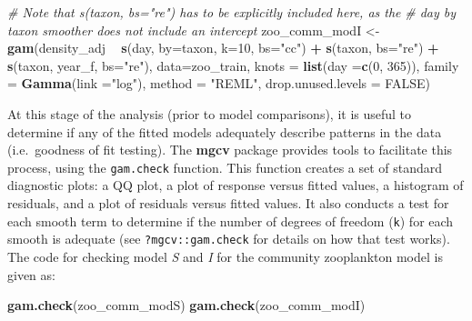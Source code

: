 \documentclass[12pt]{article}
\newenvironment{Shaded}{\begin{snugshade}}{\end{snugshade}}
\newcommand{\KeywordTok}[1]{\textcolor[rgb]{0.13,0.29,0.53}{\textbf{#1}}}
\newcommand{\DataTypeTok}[1]{\textcolor[rgb]{0.13,0.29,0.53}{#1}}
\newcommand{\DecValTok}[1]{\textcolor[rgb]{0.00,0.00,0.81}{#1}}
\newcommand{\StringTok}[1]{\textcolor[rgb]{0.31,0.60,0.02}{#1}}
\newcommand{\CommentTok}[1]{\textcolor[rgb]{0.56,0.35,0.01}{\textit{#1}}}
\newcommand{\OtherTok}[1]{\textcolor[rgb]{0.56,0.35,0.01}{#1}}
\newcommand{\OperatorTok}[1]{\textcolor[rgb]{0.81,0.36,0.00}{\textbf{#1}}}
\newcommand{\NormalTok}[1]{#1}
\begin{document}
\begin{Shaded}
\begin{Highlighting}[]
\CommentTok{# Note that  s(taxon, bs="re") has to be explicitly included here, as the }
\CommentTok{# day  by taxon smoother does not include an intercept}
\NormalTok{zoo_comm_modI <-}\StringTok{ }\KeywordTok{gam}\NormalTok{(density_adj }\OperatorTok{~}\StringTok{ }\KeywordTok{s}\NormalTok{(day, }\DataTypeTok{by=}\NormalTok{taxon,}
                                     \DataTypeTok{k=}\DecValTok{10}\NormalTok{, }\DataTypeTok{bs=}\StringTok{"cc"}\NormalTok{) }\OperatorTok{+}\StringTok{ }
\StringTok{                                   }\KeywordTok{s}\NormalTok{(taxon, }\DataTypeTok{bs=}\StringTok{"re"}\NormalTok{) }\OperatorTok{+}
\StringTok{                                   }\KeywordTok{s}\NormalTok{(taxon, year_f, }\DataTypeTok{bs=}\StringTok{"re"}\NormalTok{),}
                     \DataTypeTok{data=}\NormalTok{zoo_train,}
                     \DataTypeTok{knots =} \KeywordTok{list}\NormalTok{(}\DataTypeTok{day =}\KeywordTok{c}\NormalTok{(}\DecValTok{0}\NormalTok{, }\DecValTok{365}\NormalTok{)),}
                     \DataTypeTok{family =} \KeywordTok{Gamma}\NormalTok{(}\DataTypeTok{link =}\StringTok{"log"}\NormalTok{), }
                     \DataTypeTok{method =} \StringTok{"REML"}\NormalTok{,}
                     \DataTypeTok{drop.unused.levels =} \OtherTok{FALSE}\NormalTok{)}
\end{Highlighting}
\end{Shaded}

At this stage of the analysis (prior to model comparisons), it is useful
to determine if any of the fitted models adequately describe patterns in
the data (i.e.~goodness of fit testing). The \textbf{mgcv} package
provides tools to facilitate this process, using the \texttt{gam.check}
function. This function creates a set of standard diagnostic plots: a QQ
plot, a plot of response versus fitted values, a histogram of residuals,
and a plot of residuals versus fitted values. It also conducts a test
for each smooth term to determine if the number of degrees of freedom
(\texttt{k}) for each smooth is adequate (see \texttt{?mgcv::gam.check}
for details on how that test works). The code for checking model
\emph{S} and \emph{I} for the community zooplankton model is given as:

\begin{Shaded}
\begin{Highlighting}[]
\KeywordTok{gam.check}\NormalTok{(zoo_comm_modS)}
\KeywordTok{gam.check}\NormalTok{(zoo_comm_modI)}
\end{Highlighting}
\end{Shaded}
\end{document}
